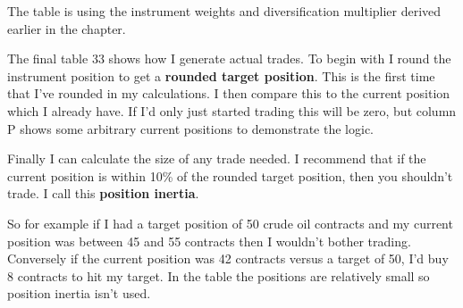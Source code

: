  \begingroup \small \centering
{}
\par \endgroup

The table is using the instrument weights and diversification multiplier derived earlier in the chapter.

The final table 33 shows how I generate actual trades. To begin with I round the instrument position to get a \textbf{rounded target position}. This is the first time that I've rounded in my calculations. I then compare this to the current position which I already have. If I'd only just started trading this will be zero, but column P shows some arbitrary current positions to demonstrate the logic.

Finally I can calculate the size of any trade needed. I recommend that if the current position is within 10\% of the rounded target position, then you shouldn't trade. I call this \textbf{position inertia}.

So for example if I had a target position of 50 crude oil contracts and my current position was between 45 and 55 contracts then I wouldn't bother trading. Conversely if the current position was 42 contracts versus a target of 50, I'd buy 8 contracts to hit my target. In the table the positions are relatively small so position inertia isn't used.

